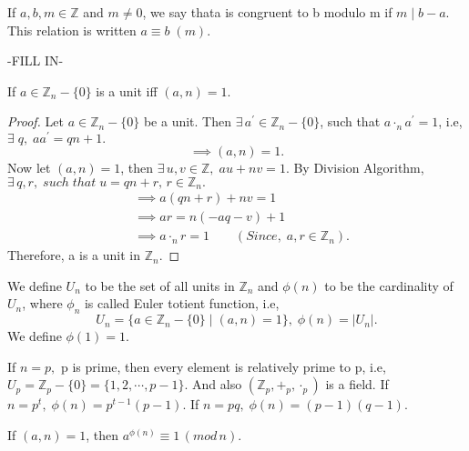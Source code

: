 \documentclass[10pt,a4paper]{article}
\begin{document}
\begin{mydef}[]
If $a,b,m\in\mathbb{Z}$ and $m\neq0$, we say thata is congruent to b modulo m if  $m\mid b-a$. This relation is written $a\equiv b\;(m).$
\end{mydef}

\begin{mydef}
-FILL IN-
\end{mydef}

\begin{theorem}
If $a\in\mathbb{Z}_n-\{0\}$ is a unit iff $(a,n)=1.$
\end{theorem}

\begin{proof}
Let $a\in\mathbb{Z}_n-\{0\}$ be a unit. Then $\exists\,a^\prime\in\mathbb{Z}_n-\{0\}$, such that $a\cdot_n a^\prime=1$, i.e, $\exists\;q,\;aa^\prime=qn+1.$ $$\implies (a,n)=1.$$ 
Now let $(a,n)=1$, then $\exists\,u,v\in\mathbb{Z},\;au+nv=1$. By Division Algorithm, $\exists\,q,r,\;such\;that\;u=qn+r,\,r\in\mathbb{Z}_n.$
\begin{align*}
&\implies a(qn+r)+nv=1 \\
&\implies ar=n(-aq-v)+1 \\
&\implies a\cdot_n r=1 \qquad(Since,\;a,r\in\mathbb{Z}_n).
\end{align*}
Therefore, a is a unit in $\mathbb{Z}_n.$
\end{proof}

\begin{mydef}
We define $U_n$ to be the set of all units in $\mathbb{Z}_n$ and $\phi(n)$ to be the cardinality of $U_n$, where $\phi_n$ is called Euler totient function, i.e, $$U_n=\{a\in\mathbb{Z}_n-\{0\}\mid (a,n)=1\},\;\phi(n)=\vert U_n\vert.$$
We define $\phi(1)=1.$
\end{mydef}

\begin{remark}
If $n=p,$ p is prime, then every element is relatively prime to p, i.e, $U_p=\mathbb{Z}_p-\{0\}=\{1,2,\cdots,p-1\}$. And also $(\mathbb{Z}_p,+_p,\cdot_p)$ is a field. If $n=p^t,\;\phi(n)=p^{t-1}(p-1).$ If $n=pq,\;\phi(n)=(p-1)(q-1).$
\end{remark}

\begin{theorem}
If $(a,n)=1$, then $a^{\phi(n)}\equiv 1\,(mod\,n).$
\end{theorem}
\end{document}
